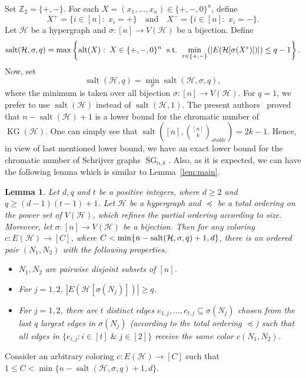 \documentclass[11pt]{amsart}
\newtheorem{lemma}{Lemma}
\theoremstyle{definition}
\theoremstyle{remark}
\def\Z{\mathbb{Z}}
\def\ds{\displaystyle}
\def\KG{\operatorname{KG}}
\def\SG{\operatorname{SG}}
\def\salt{\operatorname{salt}}
\begin{document}
Set $\Z_2=\{+,-\}$. For each $X=(x_1,\ldots,x_n)\in\{+,-,0\}^n$, define
$$X^+=\{i\in[n]:\; x_i=+\}\quad\mbox{and}\quad X^-=\{i\in[n]:\; x_i=-\}.$$
Let  $\mathcal{H}$ be a hypergraph and $\sigma: [n]\longrightarrow V(\mathcal{H})$ be a bijection.
Define 
$$\salt(\mathcal{H},\sigma,q)=\max\left\{{\rm alt}(X):\; X\in\{+,-,0\}^n\;\mbox{ s.t. }  \ds\min_{\varepsilon\in\{+,-\}}(|E(\mathcal{H}[\sigma(X^\varepsilon)])|)\leq q-1\right\}.$$
Now, set 
$$\salt(\mathcal{H},q)=\min_\sigma \salt(\mathcal{H},\sigma,q),$$
where the minimum is taken over all bijection $\sigma:[n]\longrightarrow V(\mathcal{H}).$
For $q=1$, we prefer to use $\salt(\mathcal{H})$ instead of $\salt(\mathcal{H},1)$.
The present authors~\cite{2013arXiv1302.5394A} proved that 
$n-\salt(\mathcal{H})+1$ is a lower bound for the chromatic number of $\KG(\mathcal{H})$. 
One can simply see that $\salt\left([n],{[n]\choose k}_{stable}\right)=2k-1$. 
Hence, in view of last mentioned lower bound, we have an exact 
lower bound for the chromatic number of Schrijver graphs $\SG_{n,k}$. Also, 
as it is expected, we can have the following lemma which is similar to Lemma~\ref{lem:main}. 
\begin{lemma}\label{main:lemmaSG}
Let $d,q$ and $t$ be a positive integers, where $d\geq 2$ and  $q\geq (d-1)(t-1)+1$.
Let $\mathcal{H}$ be a hypergraph and $\preceq$ be a total ordering on the power set 
of $V(\mathcal{H})$, which refines the partial ordering according to size.
Moreover, let $\sigma: [n]\longrightarrow V(\mathcal{H})$ be a bijection.
Then for any coloring  $c:E(\mathcal{H})\longrightarrow [C]$, where 
$C<\min\{n-{\rm salt}(\mathcal{H},\sigma,q)+1,d\}$, there 
is an ordered pair $(N_1,N_2)$ with the following properties.
\begin{itemize}
\item $N_1,N_2$ are pairwise disjoint subsets of $[n]$.
\item For $j=1,2$, $|E(\mathcal{H}[\sigma(N_j)])|\geq q$.
\item For $j=1,2$, there are $t$ distinct edges $e_{1,j},\ldots,e_{t,j}\subseteq \sigma(N_j)$ chosen from the last $q$ largest 
edges in  $\sigma(N_j)$ {\rm (}according to the total ordering $\preceq${\rm )} such 
that all edges in $\{e_{i,j}:i\in[t]\;\&\; j\in[2]\}$ receive the same color $c(N_1,N_2)$.
\end{itemize}
\end{lemma}
Consider an arbitrary coloring $c:E(\mathcal{H})\longrightarrow [C]$ such that $1\leq C<\min\{n-\salt(\mathcal{H},\sigma,q)+1,d\}$. 
\end{document}
